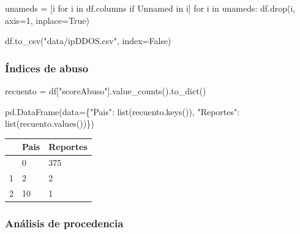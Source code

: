 \documentclass[
  letterpaper,
  DIV=11,
  numbers=noendperiod]{scrartcl}
\newenvironment{Shaded}{\begin{snugshade}}{\end{snugshade}}
\newcommand{\BuiltInTok}[1]{\textcolor[rgb]{0.00,0.23,0.31}{#1}}
\newcommand{\ControlFlowTok}[1]{\textcolor[rgb]{0.00,0.23,0.31}{#1}}
\newcommand{\DecValTok}[1]{\textcolor[rgb]{0.68,0.00,0.00}{#1}}
\newcommand{\KeywordTok}[1]{\textcolor[rgb]{0.00,0.23,0.31}{#1}}
\newcommand{\NormalTok}[1]{\textcolor[rgb]{0.00,0.23,0.31}{#1}}
\newcommand{\OperatorTok}[1]{\textcolor[rgb]{0.37,0.37,0.37}{#1}}
\newcommand{\StringTok}[1]{\textcolor[rgb]{0.13,0.47,0.30}{#1}}
\newcommand{\VariableTok}[1]{\textcolor[rgb]{0.07,0.07,0.07}{#1}}
\begin{document}
\begin{Shaded}
\begin{Highlighting}[]
\NormalTok{unameds }\OperatorTok{=}\NormalTok{ [i }\ControlFlowTok{for}\NormalTok{ i }\KeywordTok{in}\NormalTok{ df.columns }\ControlFlowTok{if} \StringTok{\textquotesingle{}Unnamed\textquotesingle{}} \KeywordTok{in}\NormalTok{ i]}
\ControlFlowTok{for}\NormalTok{ i }\KeywordTok{in}\NormalTok{ unameds:}
\NormalTok{    df.drop(i, axis}\OperatorTok{=}\DecValTok{1}\NormalTok{, inplace}\OperatorTok{=}\VariableTok{True}\NormalTok{)}
    
\NormalTok{df.to\_csv(}\StringTok{"data/ipDDOS.csv"}\NormalTok{, index}\OperatorTok{=}\VariableTok{False}\NormalTok{)}
\end{Highlighting}
\end{Shaded}

\hypertarget{uxedndices-de-abuso-1}{%
\subsubsection{Índices de abuso}\label{uxedndices-de-abuso-1}}

\begin{Shaded}
\begin{Highlighting}[]
\NormalTok{recuento }\OperatorTok{=}\NormalTok{ df[}\StringTok{"scoreAbuso"}\NormalTok{].value\_counts().to\_dict()}

\NormalTok{pd.DataFrame(data}\OperatorTok{=}\NormalTok{\{}\StringTok{"Pais"}\NormalTok{: }\BuiltInTok{list}\NormalTok{(recuento.keys()), }\StringTok{"Reportes"}\NormalTok{: }\BuiltInTok{list}\NormalTok{(recuento.values())\})}
\end{Highlighting}
\end{Shaded}

\begin{longtable}[]{@{}lll@{}}
\toprule\noalign{}
& Pais & Reportes \\
\midrule\noalign{}
\endhead
\bottomrule\noalign{}
\endlastfoot
0 & 0 & 375 \\
1 & 2 & 2 \\
2 & 10 & 1 \\
\end{longtable}

\hypertarget{anuxe1lisis-de-procedencia-1}{%
\subsubsection{Análisis de
procedencia}\label{anuxe1lisis-de-procedencia-1}}
\end{document}
